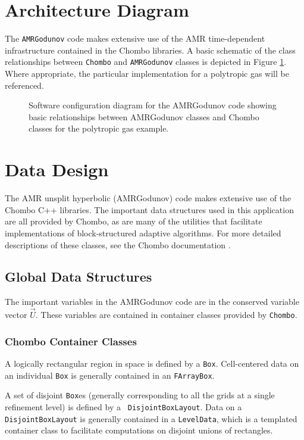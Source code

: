 
\section{Architecture Diagram}

The {\tt AMRGodunov} code makes extensive use of the AMR
time-dependent infrastructure contained in the Chombo libraries. A
basic schematic of the class relationships between {\tt Chombo} and
{\tt AMRGodunov} classes is depicted in Figure \ref{fig:AMRGod}. 
Where appropriate, the particular implementation for a polytropic gas
will be referenced.

\begin{figure}
\centerline{}
\caption{Software configuration diagram for the AMRGodunov code showing
basic relationships between AMRGodunov classes and Chombo classes for
the polytropic gas example.}
\label{fig:AMRGod}
\end{figure}



\section{Data Design}
The AMR unsplit hyperbolic (AMRGodunov) code makes extensive use
of the Chombo C++ libraries.  The important data structures used
in this application are all provided by Chombo, as are many of the
utilities that facilitate implementations of block-structured
adaptive algorithms.  For more detailed descriptions of these classes,
see the Chombo documentation \cite{ChomboDesign}.

\subsection{Global Data Structures}
The important variables in the AMRGodunov code are in the conserved
variable vector $\vec{U}$. These variables are contained in container
classes provided by {\tt Chombo}.  

\subsubsection{Chombo Container Classes}
A logically rectangular region in space is defined by a {\tt Box}.
Cell-centered data on an individual {\tt Box} is generally
contained in an {\tt FArrayBox}.

A set of disjoint {\tt Box}es (generally corresponding to all
the grids at a single refinement level) is defined by a {\tt
DisjointBoxLayout}.  Data on a {\tt DisjointBoxLayout} is generally
contained in a {\tt LevelData}, which is a templated container class
to facilitate computations on disjoint unions of rectangles.  


